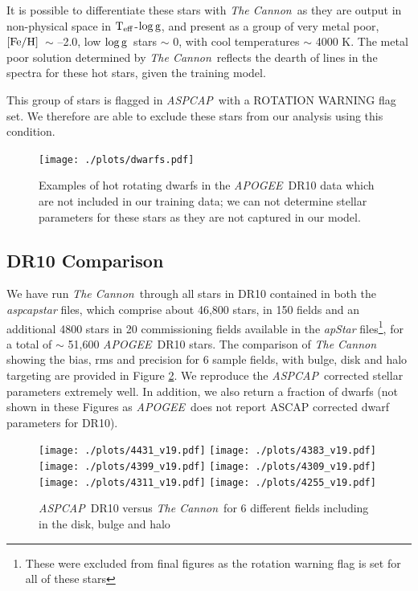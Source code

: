 \documentclass[12pt, preprint]{aastex}
\newcommand{\teff}{\mbox{$\rm T_{eff}$}}
\newcommand{\feh}{\mbox{$\rm [Fe/H]$}}
\newcommand{\logg}{\mbox{$\rm \log g$}}
\newcommand{\tc}{\textsl{The Cannon}}
\newcommand{\apogee}{\textsl{APOGEE}}
\newcommand{\aspcap}{\textsl{ASPCAP}}
\begin{document}
It is possible to differentiate these stars with \tc\, as they are output in non-physical space in \teff-\logg, and present as a group of very metal poor, \feh\ $\sim$ --2.0, low \logg\ stars $\sim$ 0, with cool temperatures $\sim$ 4000 K. The metal poor solution determined by \tc\ reflects the dearth of lines in the spectra for these hot stars, given the training model. 

This group of stars is flagged in \aspcap\ with a ROTATION WARNING flag set. We therefore are able to exclude these stars from our analysis using this condition. 
 
 \begin{figure}[h]
 \texttt{[image: ./plots/dwarfs.pdf]}
  \caption{Examples of hot rotating dwarfs in the \apogee\ DR10 data which are not included in our training data; we can not determine stellar parameters for these stars as they are not captured in our model.}
\label{fig:dwarfs}
\end{figure}

\subsection{DR10 Comparison}
 
We have run \tc\ through all stars in DR10 contained in both the \textit{aspcapstar} files,  which comprise about 46,800 stars, in 150 fields and an additional 4800 stars in 20 commissioning fields available in the \textit{apStar} files\footnote{These were excluded from final figures as the rotation warning flag is set for all of these stars}, for a total of $\sim$ 51,600 \apogee\ DR10 stars. The comparison of \tc\, showing the bias, rms and precision for 6 sample fields, with bulge, disk and halo targeting are provided in Figure \ref{fig:cal}. We reproduce the \aspcap\ corrected stellar parameters extremely well. In addition, we also return a fraction of dwarfs (not shown in these Figures as \apogee\ does not report ASCAP corrected dwarf parameters for DR10). 

\begin{figure}[h!]
\centering
  \texttt{[image: ./plots/4431\_v19.pdf]}
    \texttt{[image: ./plots/4383\_v19.pdf]} \\
      \texttt{[image: ./plots/4399\_v19.pdf]}
        \texttt{[image: ./plots/4309\_v19.pdf]} \\
              \texttt{[image: ./plots/4311\_v19.pdf]}
        \texttt{[image: ./plots/4255\_v19.pdf]} \\
\caption{\small{\aspcap\ DR10 versus \tc\ for 6 different fields including in the disk, bulge and halo}}
\label{fig:cal}
\end{figure}
\end{document}
